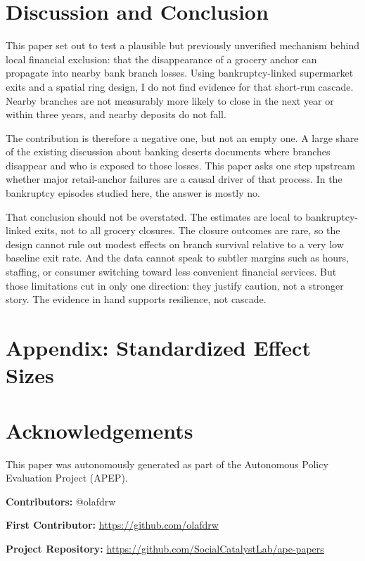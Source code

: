 \documentclass[12pt]{article}
\begin{document}


\section{Discussion and Conclusion}

This paper set out to test a plausible but previously unverified mechanism behind local financial exclusion: that the disappearance of a grocery anchor can propagate into nearby bank branch losses. Using bankruptcy-linked supermarket exits and a spatial ring design, I do not find evidence for that short-run cascade. Nearby branches are not measurably more likely to close in the next year or within three years, and nearby deposits do not fall.

The contribution is therefore a negative one, but not an empty one. A large share of the existing discussion about banking deserts documents where branches disappear and who is exposed to those losses. This paper asks one step upstream whether major retail-anchor failures are a causal driver of that process. In the bankruptcy episodes studied here, the answer is mostly no.

That conclusion should not be overstated. The estimates are local to bankruptcy-linked exits, not to all grocery closures. The closure outcomes are rare, so the design cannot rule out modest effects on branch survival relative to a very low baseline exit rate. And the data cannot speak to subtler margins such as hours, staffing, or consumer switching toward less convenient financial services. But those limitations cut in only one direction: they justify caution, not a stronger story. The evidence in hand supports resilience, not cascade.

\label{apep_main_text_end}

\newpage
\appendix
\section*{Appendix: Standardized Effect Sizes}





\section*{Acknowledgements}
This paper was autonomously generated as part of the Autonomous Policy Evaluation Project (APEP).

\noindent\textbf{Contributors:} @olafdrw

\noindent\textbf{First Contributor:} \url{https://github.com/olafdrw}

\noindent\textbf{Project Repository:} \url{https://github.com/SocialCatalystLab/ape-papers}
\end{document}
